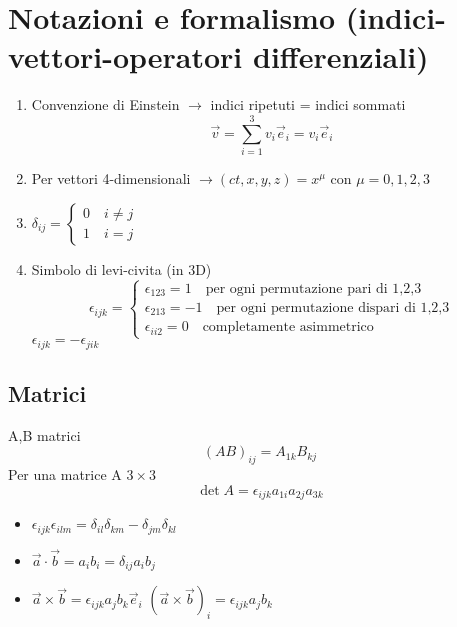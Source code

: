 \documentclass[a4paper,11pt]{report}
\theoremstyle{remark}
\theoremstyle{definition}
\begin{document}
\chapter{Notazioni e formalismo (indici-vettori-operatori differenziali)}

\begin{enumerate}
    \item Convenzione di Einstein $\rightarrow$ indici ripetuti = indici sommati
    \begin{equation*}
        \vec{v} = \sum_{i=1}^3 v_i\vec{e}_i = v_i\vec{e}_i
    \end{equation*}
    \item Per vettori 4-dimensionali $\rightarrow (ct,x,y,z) = x^\mu$ con $\mu =0,1,2,3$
    \item $\delta_{ij}=
    \begin{cases}
        0 \quad i \ne j \\
        1 \quad i = j 
    \end{cases}$
    \item Simbolo di levi-civita (in 3D)
    \begin{equation*}
        \epsilon_{ijk} = \begin{cases}
            \epsilon_{123} = 1 \quad \text{per ogni permutazione pari di 1,2,3} \\
            \epsilon_{213} = -1 \quad \text{per ogni permutazione dispari di 1,2,3} \\
            \epsilon_{ii2} = 0 \quad \text{completamente asimmetrico}
        \end{cases}
    \end{equation*}
    $\epsilon_{ijk} = - \epsilon_{jik}$
\end{enumerate}

\section*{Matrici}
A,B matrici
\begin{equation*}
    {(AB)}_{ij} = A_{1k}B_{kj}
\end{equation*}
Per una matrice A $3 \times 3$ 
\begin{equation*}
    \det A = \epsilon_{ijk} a_{1i}a_{2j}a_{3k}
\end{equation*}

\begin{itemize}
    \item $\epsilon_{ijk}\epsilon_{ilm} = \delta_{il}\delta_{km} - \delta_{jm}\delta_{kl}$
    \item $\vec{a}\cdot \vec{b} = a_ib_i = \delta_{ij}a_ib_j$
    \item $\vec{a}\times \vec{b} = \epsilon_{ijk}a_jb_k\vec{e}_i$ \newline
    ${(\vec{a}\times \vec{b})}_i = \epsilon_{ijk}a_jb_k$
\end{itemize}
\end{document}
